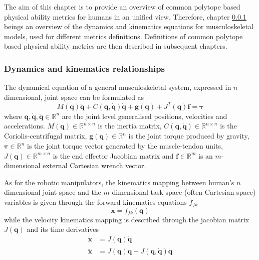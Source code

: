 The aim of this chapter is to provide an overview of common polytope based physical ability metrics for humans in an unified view. Therefore, chapter \ref{ch:human_dyn_kin} beings an overview of the dynamics and kinematics equations for musculoskeletal models, used for different metrics definitions. Definitions of common polytope based physical ability metrics are then described in subsequent chapters.

\subsubsection{Dynamics and kinematics relationships}
\label{ch:human_dyn_kin}
The dynamical equation of a general musculoskeletal system, expressed in $n$ dimensional, joint space can be formulated as
\begin{equation}
    M(\bm{q})\ddot{\bm{q}} + C(\bm{q},\dot{\bm{q}})\dot{\bm{q}} + \bm{g}(\bm{q}) + J^{T}(\bm{q})\bm{f} = \bm{\tau} 
    \label{eq:human_dynamics}
\end{equation}
where $\bm{q},\dot{\bm{q}},\ddot{\bm{q}} \in \mathbb{R}^n $ are the joint level generalised positions, velocities and accelerations. $M(\bm{q})\in \mathbb{R}^{n\times n}$ is the inertia matrix, $C (\bm{q}, \dot{\bm{q}})\in \mathbb{R}^{n\times n}$ is the Coriolis-centrifugal matrix, $\bm{g}(\bm{q})\in \mathbb{R}^n$ is the joint torque produced by gravity, $\bm{\tau}\in \mathbb{R}^n$ is the joint torque vector generated by the muscle-tendon units, $J(\bm{q})\in\mathbb{R}^{m\times n}$ is the end effector Jacobian matrix and $\bm{f} \in \mathbb{R}^m$ is an $m$-dimensional external Cartesian wrench vector.

As for the robotic manipulators, the kinematics mapping between human's $n$ dimensional joint space and the  $m$ dimensional task space (often Cartesian space) variables is given through the forward kinematics equations $f_{fk}$ 
\begin{equation}
    \bm{x} = f_{fk} (\bm{q})
\end{equation}
while the velocity kinematics mapping is described through the jacobian matrix $J(\bm{q})$ and its time derivatives
\begin{subequations}
\begin{align}
\dot{\bm{x}}&= {J}(\bm{q})\dot{\bm{q}} \label{eq:js_to_cs_vaj_human:vel}\\
\ddot{\bm{x}}&= J(\bm{q})\ddot{\bm{q}} + \dot{J}(\bm{q},\dot{\bm{q}})\dot{\bm{q}} \label{eq:js_to_cs_vaj_human:accel}
 \end{align} \label{eq:js_to_cs_vaj_human}
\end{subequations}


